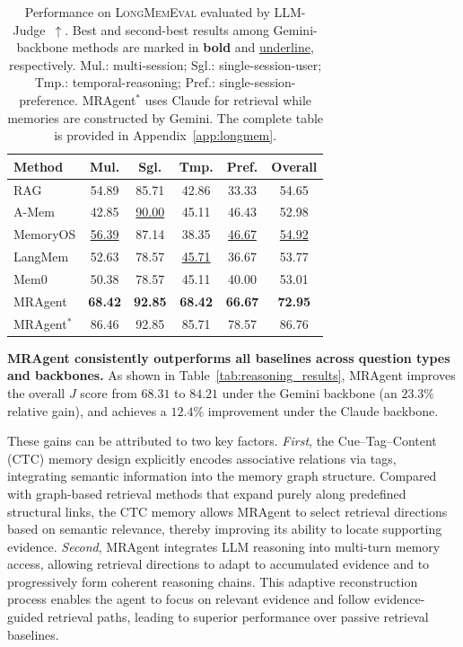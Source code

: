 \begin{table}[t]
\centering
\small
\setlength{\tabcolsep}{5pt}
\caption{Performance on \textsc{LongMemEval} evaluated by LLM-Judge~$\uparrow$.
Best and second-best results among Gemini-backbone methods are marked in
\textbf{bold} and \underline{underline}, respectively.
Mul.: multi-session; Sgl.: single-session-user; Tmp.: temporal-reasoning;
Pref.: single-session-preference.
MRAgent$^{*}$ uses Claude for retrieval while memories are constructed by Gemini.
The complete table is provided in Appendix~\ref{app:longmem}.}
\begin{tabular}{lcccc|c}
\toprule
Method & Mul. & Sgl. & Tmp. & Pref. & Overall \\
\midrule
RAG       
& 54.89 
& 85.71 
& 42.86
& 33.33 
& 54.65 \\

A-Mem     
& 42.85 
& \underline{90.00} 
& 45.11  
& 46.43 
& 52.98 \\

MemoryOS 
& \underline{56.39} 
& 87.14 
& 38.35 
& \underline{46.67} 
& \underline{54.92} \\

LangMem  
& 52.63 
& 78.57 
& \underline{45.71} 
& 36.67 
& 53.77 \\

Mem0
& 50.38
& 78.57
& 45.11
& 40.00
& 53.01 \\

MRAgent  
& \textbf{68.42} 
& \textbf{92.85} 
& \textbf{68.42} 
& \textbf{66.67} 
& \textbf{72.95} \\

\midrule
MRAgent$^{*}$  
& 86.46 
& 92.85  
& 85.71 
& 78.57 
& 86.76 \\
\bottomrule
\end{tabular}
\label{tab:longmem}
\end{table}




\textbf{MRAgent consistently outperforms all baselines across question types and backbones.}
As shown in Table~\ref{tab:reasoning_results}, MRAgent improves the overall $J$ score from $68.31$ to $84.21$ under the Gemini backbone (an $23.3\%$ relative gain), and achieves a $12.4\%$ improvement under the Claude backbone.

These gains can be attributed to two key factors.
\textit{First}, the Cue–Tag–Content (CTC) memory design explicitly encodes
associative relations via tags, integrating semantic information into the
memory graph structure.
Compared with graph-based retrieval methods that expand purely along predefined
structural links, the CTC memory allows MRAgent to select retrieval directions
based on semantic relevance, thereby improving its ability to locate supporting
evidence.
\textit{Second}, MRAgent integrates LLM reasoning into multi-turn memory access,
allowing retrieval directions to adapt to accumulated evidence and to
progressively form coherent reasoning chains.
This adaptive reconstruction process enables the agent to focus on relevant
evidence and follow evidence-guided retrieval paths, leading to
superior performance over passive retrieval baselines.

